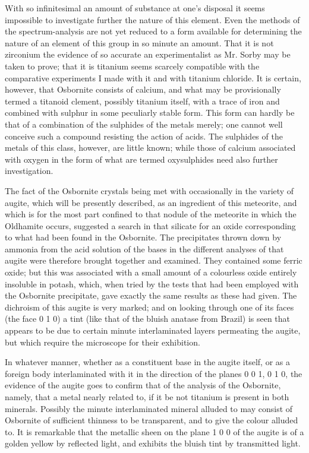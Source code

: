 \documentclass[a4paper, 12pt, oneside]{article}
\begin{document}
With so infinitesimal an amount of substance at one's disposal it seems impossible to investigate further the nature of this element. Even the methods of the spectrum-analysis are not yet reduced to a form available for determining the nature of an element of this group in so minute an amount. That it is not zirconium the evidence of so accurate an experimentalist as Mr. Sorby may be taken to prove; that it is titanium seems scarcely compatible with the comparative experiments I made with it and with titanium chloride. It is certain, however, that Osbornite consists of calcium, and what may be provisionally termed a titanoid clement, possibly titanium itself, with a trace of iron and combined with sulphur in some peculiarly stable form. This form can hardly be that of a combination of the sulphides of the metals merely; one cannot well conceive such a compound resisting the action of acids. The sulphides of the metals of this class, however, are little known; while those of calcium associated with oxygen in the form of what are termed oxysulphides need also further investigation.

The fact of the Osbornite crystals being met with occasionally in the variety of augite, which will be presently described, as an ingredient of this meteorite, and which is for the most part confined to that nodule of the meteorite in which the Oldhamite occurs, suggested a search in that silicate for an oxide corresponding to what had been found in the Osbornite. The precipitates thrown down by ammonia from the acid solution of the bases in the different analyses of that augite were therefore brought together and examined. They contained some ferric oxide; but this was associated with a small amount of a colourless oxide entirely insoluble in potash, which, when tried by the tests that had been employed with the Osbornite precipitate, gave exactly the same results as these had given. The dichroism of this augite is very marked; and on looking through one of its faces (the face 0 1 0) a tint (like that of the bluish anatase from Brazil) is seen that appears to be due to certain minute interlaminated layers permeating the augite, but which require the microscope for their exhibition.

In whatever manner, whether as a constituent base in the augite itself, or as a foreign body interlaminated with it in the direction of the planes 0 0 1, 0 1 0, the evidence of the augite goes to confirm that of the analysis of the Osbornite, namely, that a metal nearly related to, if it be not titanium is present in both minerals. Possibly the minute interlaminated mineral alluded to may consist of Osbornite of sufficient thinness to be transparent, and to give the colour alluded to. It is remarkable that the metallic sheen on the plane 1 0 0 of the augite is of a golden yellow by reflected light, and exhibits the bluish tint by transmitted light.
\end{document}
